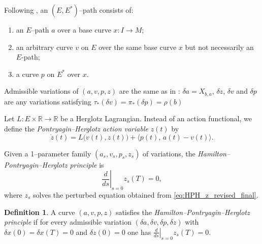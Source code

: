 \documentclass[11pt,a4paper]{article}
\theoremstyle{definition}
\newtheorem{definition}[theorem]{Definition}
\begin{document}
Following \cite[Def.~5.3]{li2017lagrangian}, an $(E,E^*)$--path consists of:
\begin{enumerate}
\item[(i)] an $E$–path $a$ over a base curve $x\colon I\to M$;
\item[(ii)] an arbitrary curve $v$ on $E$ over the same base curve $x$ but not necessarily an $E$-path;
\item[(iii)] a curve $p$ on $E^*$ over $x$.
\end{enumerate}

Admissible variations of $(a,v,p, z)$ are the same as in
\cite{li2017lagrangian}: $\delta a=X_{b,a}$, $\delta z$, $\delta v$ and $\delta p$ are any variations satisfying $\tau_{*}(\delta v)=\pi_{*}(\delta p)=\rho(b)$ 




Let $L\colon E\times\mathbb{R}\to \mathbb{R}$ be a Herglotz Lagrangian.
Instead of an action functional, we define the
\emph{Pontryagin--Herglotz action variable} $z(t)$ by
\begin{equation}\label{eq:HPH_z_revised_final}
\dot z(t)
=
L\big(v(t),z(t)\big)
+
\langle p(t),\,a(t)-v(t)\rangle.
\end{equation}

Given a 1–parameter family $(a_s,v_s,p_s,z_s)$ of variations, the
\emph{Hamilton--Pontryagin--Herglotz principle} is
\[
\left.\frac{d}{ds}\right|_{s=0} z_s(T)=0,
\]
where $z_s$ solves the perturbed equation obtained from
\eqref{eq:HPH_z_revised_final}.

\begin{definition}
A curve $(a,v,p,z)$ satisfies the
\emph{Hamilton--Pontryagin--Herglotz principle}
if for every admissible variation
$(\delta a,\delta v,\delta p,\delta z)$ with
$\delta x(0)=\delta x(T)=0$ and $\delta z(0)=0$ one has
$\displaystyle \left.\frac{d}{ds}\right|_{s=0} z_s(T)=0$.
\end{definition}
\end{document}
